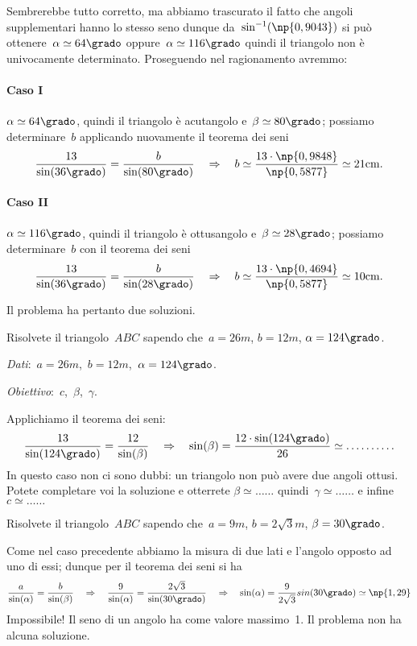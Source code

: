 Sembrerebbe tutto corretto, ma abbiamo trascurato il fatto che angoli supplementari hanno lo stesso seno dunque
da~$\sin ^{-1}(\np{0,9043})$ si può ottenere~$\alpha\simeq 64\grado$ oppure~$\alpha\simeq 116\grado$
quindi il triangolo non è univocamente determinato. Proseguendo nel ragionamento avremmo:

\paragraph{Caso I}
$\alpha\simeq 64\grado$, quindi il triangolo è acutangolo e~$\beta\simeq 80\grado$; possiamo determinare~$b$ applicando nuovamente
il teorema dei seni
\[\frac{13}{\sin(36\grado)}=\frac{b}{\sin(80\grado)}\quad\Rightarrow\quad b\simeq \frac{13\cdot\np{0,9848}}{\np{0,5877}}\simeq 21\unit{cm}.\]

\paragraph{Caso II}
$\alpha\simeq 116\grado$, quindi il triangolo è ottusangolo e~$\beta\simeq 28\grado$; possiamo determinare~$b$ con
il teorema dei seni
\[\frac{13}{\sin(36\grado)}=\frac{b}{\sin(28\grado)}\quad\Rightarrow\quad b\simeq \frac{13\cdot\np{0,4694}}{\np{0,5877}}\simeq 10\unit{cm}.\]

Il problema ha pertanto due soluzioni.

\begin{problema}
Risolvete il triangolo~$ABC$ sapendo che~$a= 26\unit{m}$, $b= 12\unit{m}$, $\alpha=124\grado$.
\end{problema}

\emph{Dati}:~$a= 26\unit{m}$,\quad~$b= 12\unit{m}$,\quad~$\alpha=124\grado$.

\emph{Obiettivo}:~$c$,\quad~$\beta$,\quad~$\gamma$.

Applichiamo il teorema dei seni:
\[\frac{13}{\sin(124\grado)}=\frac{12}{\sin(\beta)}\quad\Rightarrow\quad \sin(\beta)=\frac{12\cdot\sin(124\grado)}{26}\simeq\ldots \ldots \ldots.\]
In questo caso non ci sono dubbi: un triangolo non può avere due angoli ottusi. Potete completare voi la soluzione e otterrete
$\beta\simeq \ldots\ldots$ quindi~$\gamma\simeq \ldots\ldots$ e infine~$c\simeq \ldots\ldots$

\begin{problema}
Risolvete il triangolo~$ABC$ sapendo che~$a= 9\unit{m}$, $b=2\sqrt{3}\unit{m}$, $\beta=30\grado$.
\end{problema}
Come nel caso precedente abbiamo la misura di due lati e l'angolo opposto ad uno di essi; dunque per il teorema dei seni si ha
\[\frac{a}{\sin(\alpha)}=\frac{b}{\sin(\beta)} \quad\Rightarrow\quad \frac{9}{\sin(\alpha)}=\frac{2\sqrt{3}}{\sin(30\grado)}\quad\Rightarrow\quad
\sin(\alpha)=\frac{9}{2\sqrt{3}}sin(30\grado)\simeq \np{1,29}\]
Impossibile! Il seno di un angolo ha come valore massimo~1.
Il problema non ha alcuna soluzione.


